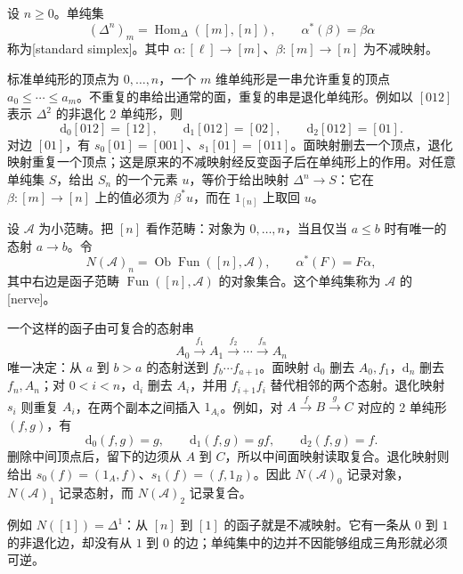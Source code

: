 \begin{definition}\label{b4:def:F-standard-simplex}
	设 \(n\ge0\)。单纯集
	\[
		(\Delta^n)_m=\operatorname{Hom}_{\Delta}([m],[n]), \qquad \alpha^*(\beta)=\beta\alpha
	\]
	称为[standard simplex]。其中 \(\alpha:[\ell]\rightarrow[m]\)、\(\beta:[m]\rightarrow[n]\) 为不减映射。
\end{definition}

标准单纯形的顶点为 \(0,\ldots,n\)，一个 \(m\) 维单纯形是一串允许重复的顶点 \(a_0\le\cdots\le a_m\)。不重复的串给出通常的面，重复的串是退化单纯形。例如以 \([012]\) 表示 \(\Delta^2\) 的非退化 2 单纯形，则
\[
	\mathrm d_0[012]=[12],\qquad \mathrm d_1[012]=[02],\qquad \mathrm d_2[012]=[01].
\]
对边 \([01]\)，有 \(s_0[01]=[001]\)、\(s_1[01]=[011]\)。面映射删去一个顶点，退化映射重复一个顶点；这是原来的不减映射经反变函子后在单纯形上的作用。对任意单纯集 \(S\)，给出 \(S_n\) 的一个元素 \(u\)，等价于给出映射 \(\Delta^n\rightarrow S\)：它在 \(\beta:[m]\rightarrow[n]\) 上的值必须为 \(\beta^*u\)，而在 \(1_{[n]}\) 上取回 \(u\)。

\begin{definition}\label{b4:def:F-category-nerve}
	设 \(\mathcal A\) 为小范畴。把 \([n]\) 看作范畴：对象为 \(0,\ldots,n\)，当且仅当 \(a\le b\) 时有唯一的态射 \(a\rightarrow b\)。令
	\[
		N(\mathcal A)_n=\operatorname{Ob}\operatorname{Fun}([n],\mathcal A), \qquad \alpha^*(F)=F\alpha,
	\]
	其中右边是函子范畴 \(\operatorname{Fun}([n],\mathcal A)\) 的对象集合。这个单纯集称为 \(\mathcal A\) 的[nerve]。
\end{definition}

一个这样的函子由可复合的态射串
\[
	A_0\xrightarrow{f_1}A_1\xrightarrow{f_2}\cdots \xrightarrow{f_n}A_n
\]
唯一决定：从 \(a\) 到 \(b>a\) 的态射送到 \(f_b\cdots f_{a+1}\)。面映射 \(\mathrm d_0\) 删去 \(A_0,f_1\)，\(\mathrm d_n\) 删去 \(f_n,A_n\)；对 \(0<i<n\)，\(\mathrm d_i\) 删去 \(A_i\)，并用 \(f_{i+1}f_i\) 替代相邻的两个态射。退化映射 \(s_i\) 则重复 \(A_i\)，在两个副本之间插入 \(1_{A_i}\)。例如，对 \(A\xrightarrow fB\xrightarrow gC\) 对应的 2 单纯形 \((f,g)\)，有
\[
	\mathrm d_0(f,g)=g,\qquad \mathrm d_1(f,g)=gf,\qquad \mathrm d_2(f,g)=f.
\]
删除中间顶点后，留下的边须从 \(A\) 到 \(C\)，所以中间面映射读取复合。退化映射则给出 \(s_0(f)=(1_A,f)\)、\(s_1(f)=(f,1_B)\)。因此 \(N(\mathcal A)_0\) 记录对象，\(N(\mathcal A)_1\) 记录态射，而 \(N(\mathcal A)_2\) 记录复合。

\ProseParagraphBreak
例如 \(N([1])=\Delta^1\)：从 \([n]\) 到 \([1]\) 的函子就是不减映射。它有一条从 \(0\) 到 \(1\) 的非退化边，却没有从 \(1\) 到 \(0\) 的边；单纯集中的边并不因能够组成三角形就必须可逆。

